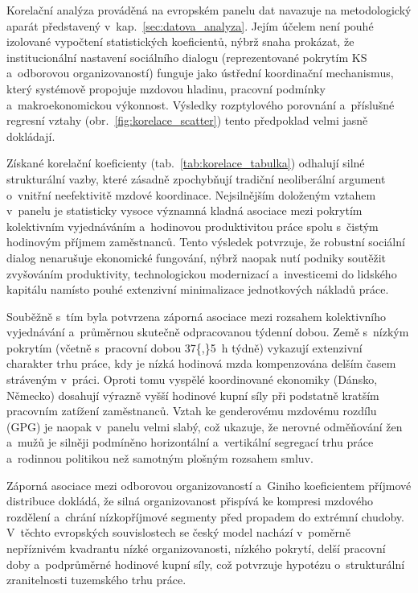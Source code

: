 Korelační analýza prováděná na evropském panelu dat navazuje na metodologický aparát představený v~kap.~\ref{sec:datova_analyza}. Jejím účelem není pouhé izolované vypočtení statistických koeficientů, nýbrž snaha prokázat, že institucionální nastavení sociálního dialogu (reprezentované pokrytím \acs{KS} a~odborovou organizovaností) funguje jako ústřední koordinační mechanismus, který systémově propojuje mzdovou hladinu, pracovní podmínky a~makroekonomickou výkonnost. Výsledky rozptylového porovnání a~příslušné regresní vztahy (obr.~\ref{fig:korelace_scatter}) tento předpoklad velmi jasně dokládají.\par



Získané korelační koeficienty (tab.~\ref{tab:korelace_tabulka}) odhalují silné strukturální vazby, které zásadně zpochybňují tradiční neoliberální argument o~vnitřní neefektivitě mzdové koordinace. Nejsilnějším doloženým vztahem v~panelu je statisticky vysoce významná kladná asociace mezi pokrytím kolektivním vyjednáváním a~hodinovou produktivitou práce spolu s~čistým hodinovým příjmem zaměstnanců. Tento výsledek potvrzuje, že robustní sociální dialog nenarušuje ekonomické fungování, nýbrž naopak nutí podniky soutěžit zvyšováním produktivity, technologickou modernizací a~investicemi do lidského kapitálu namísto pouhé extenzivní minimalizace jednotkových nákladů práce.\par

Souběžně s~tím byla potvrzena záporná asociace mezi rozsahem kolektivního vyjednávání a~průměrnou skutečně odpracovanou týdenní dobou. Země s~nízkým pokrytím  (včetně  s~pracovní dobou \SI{37{,}5}{\hour} týdně) vykazují extenzivní charakter trhu práce, kdy je nízká hodinová mzda kompenzována delším časem stráveným v~práci. Oproti tomu vyspělé koordinované ekonomiky (Dánsko, Německo) dosahují výrazně vyšší hodinové kupní síly při podstatně kratším pracovním zatížení zaměstnanců. Vztah ke genderovému mzdovému rozdílu (\acs{GPG}) je naopak v~panelu velmi slabý, což ukazuje, že nerovné odměňování žen a~mužů je silněji podmíněno horizontální a~vertikální segregací trhu práce a~rodinnou politikou než samotným plošným rozsahem smluv.\par



Záporná asociace mezi odborovou organizovaností a~Giniho koeficientem příjmové distribuce dokládá, že silná organizovanost přispívá ke kompresi mzdového rozdělení a~chrání nízkopříjmové segmenty před propadem do extrémní chudoby. V~těchto evropských souvislostech se český model nachází v~poměrně nepříznivém kvadrantu nízké organizovanosti, nízkého pokrytí, delší pracovní doby a~podprůměrné hodinové kupní síly, což potvrzuje hypotézu o~strukturální zranitelnosti tuzemského trhu práce.\par

